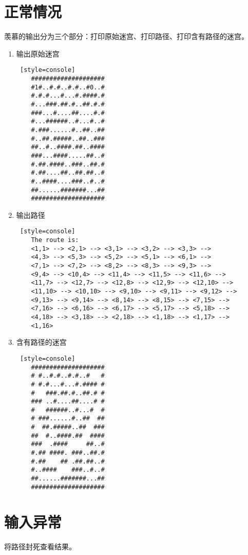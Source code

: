 \section{正常情况}
羡慕的输出分为三个部分：打印原始迷宫、打印路径、打印含有路径的迷宫。
\begin{enumerate}
    \item 输出原始迷宫
\begin{lstlisting} [style=console]
    ####################
    #1#..#.#..#.#..#0..#
    #.#.#...#...#.####.#
    #...###.##.#..##.#.#
    ###...#....##....#.#
    #...######..#...#..#
    #.###......#..##..##
    #..##.#####..##..###
    ##..#..####.##..####
    ###...####.....##..#
    #.##.####..###..##.#
    #.##....##..##.##..#
    #..####....###..#..#
    ##......#######...##
    ####################    
\end{lstlisting}

    \item 输出路径
\begin{lstlisting} [style=console]
    The route is: 
    <1,1> --> <2,1> --> <3,1> --> <3,2> --> <3,3> --> 
    <4,3> --> <5,3> --> <5,2> --> <5,1> --> <6,1> --> 
    <7,1> --> <7,2> --> <8,2> --> <8,3> --> <9,3> --> 
    <9,4> --> <10,4> --> <11,4> --> <11,5> --> <11,6> --> 
    <11,7> --> <12,7> --> <12,8> --> <12,9> --> <12,10> --> 
    <11,10> --> <10,10> --> <9,10> --> <9,11> --> <9,12> --> 
    <9,13> --> <9,14> --> <8,14> --> <8,15> --> <7,15> --> 
    <7,16> --> <6,16> --> <6,17> --> <5,17> --> <5,18> --> 
    <4,18> --> <3,18> --> <2,18> --> <1,18> --> <1,17> --> 
    <1,16>
\end{lstlisting}    

    \item 含有路径的迷宫
\begin{lstlisting} [style=console]
    ####################
    # #..#.#..#.#..#   #
    # #.#...#...#.#### #
    #   ###.##.#..##.# #
    ### ..#....##....# #
    #   ######..#...#  #
    # ###......#..##  ##
    #  ##.#####..##  ###
    ##  #..####.##  ####
    ###  .####     ##..#
    #.## ####. ###..##.#
    #.##    ## .##.##..#
    #..####    ###..#..#
    ##......#######...##
    ####################
\end{lstlisting}    

\end{enumerate}


\section{输入异常}
将路径封死查看结果。

